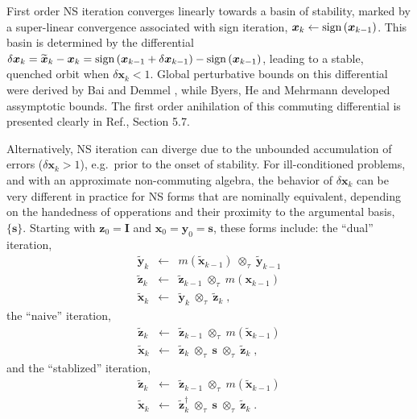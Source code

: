 \documentclass[letterpaper,twocolumn,amsmath,amsfont,amssymb,english,aps,jcp,preprintnumbers,groupaddress,nofootinbib,tightenlines]{revtex4}
\newcommand{\mat}[1]{\boldsymbol{#1}}
\newcommand{\mmat}[1]{\widetilde{\boldsymbol{#1}}}
\newcommand{\ot}{ {\scriptstyle \otimes}_{ \tau } }
\begin{document}
First order NS iteration converges linearly towards a basin of stability, marked by a super-linear convergence 
associated with sign iteration,  $\mat{x}_k \leftarrow {\rm sign} \left( \mat{x}_{k-1} \right)$. 
This basin is determined by the differential 
$\delta \mat{x}_k = \widetilde{\mat{x}}_k -\mat{x}_k = {\rm sign} \left(\mat{x}_{k-1}+\delta \mat{x}_{k-1} \right)
-{\rm sign} \left(\mat{x}_{k-1} \right)$,  leading to a stable, quenched orbit when $\delta \mat{x}_k < 1 $.  
Global perturbative bounds on this differential were derived by Bai and Demmel \cite{Bai98usingthe}, while
Byers, He and Mehrmann \cite{} developed assymptotic bounds.  The first order anihilation of 
this commuting differential is presented clearly in Ref.\cite{Higham08}, Section 5.7.

Alternatively, NS iteration can diverge due to the unbounded accumulation of errors ($\delta \mat{x}_k > 1 $), e.g.~prior
to the onset of stability.  For ill-conditioned problems, and with an approximate non-commuting algebra, the 
behavior of $\delta \mat{x}_k $ can be very different in practice for NS forms that are nominally equivalent,
depending on the handedness of opperations and their proximity to the argumental basis, $\{ \mat{s} \}$.  
Starting with $\mat{z}_0=\mat{I}$ and $\mat{x}_0=\mat{y}_0=\mat{s}$, these forms include: the ``dual'' iteration,
\begin{eqnarray} \label{dualsiteration}
\mmat{y}_{k}  &\leftarrow& m \left( \mmat{x}_{k-1} \right) \; \ot \;  \mmat{y}_{k-1}  \\
\mmat{z}_{k}  &\leftarrow& \mmat{z}_{k-1}  \; \ot \;  m \left( \mat{x}_{k-1} \right) \\
\mmat{x}_{k} &\leftarrow& \mmat{y}_{k} \; \ot \; \mmat{z}_{k} \; ,
\end{eqnarray}
the ``naive'' iteration,
\begin{eqnarray}
\mmat{z}_{k}  &\leftarrow& \mmat{z}_{k-1} \; \ot \; m \left( \mmat{x}_{k-1} \right) \\
\mmat{x}_{k} &\leftarrow& \mmat{z}_{k} \; \ot \; \mat{s} \; \ot \; \mmat{z}_{k} \; ,
\end{eqnarray}
and the ``stablized'' iteration,
\begin{eqnarray}
\mmat{z}_{k}  &\leftarrow& \mmat{z}_{k-1}  \; \ot \; m \left( \mmat{x}_{k-1} \right) \\
\mmat{x}_{k} &\leftarrow& \mmat{z}^\dagger_{k} \; \ot \; \mat{s} \; \ot \; \mmat{z}_{k} \; .
\end{eqnarray}
\end{document}

